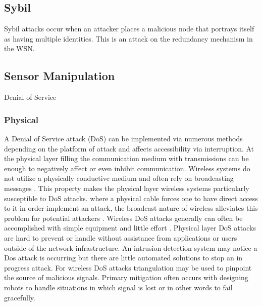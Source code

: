 \subsection{Sybil}
Sybil attacks occur when an attacker places a malicious node that portrays itself as having multiple identities. This is an attack on the redundancy mechanism in the WSN. 
\subsection{Sensor Manipulation}

Denial of Service 


\subsubsection{Physical}
A Denial of Service attack (DoS) can be implemented via numerous methods depending on the platform of attack and affects accessibility via interruption. At the physical layer filling the communication medium with transmissions can be enough to negatively affect or even inhibit communication.  Wireless systems do not utilize a physically conductive medium and often rely on broadcasting messages \cite{Cepheli-2013}.  This property makes the physical layer wireless systems particularly susceptible to DoS attacks. where a physical cable forces one to have direct access to it in order implement an attack, the broadcast nature of wireless alleviates this problem for potential attackers \cite{pelechrinis:denial}.  Wireless DoS attacks generally can often be accomplished with simple equipment and little effort \cite{pelechrinis:denial}.  Physical layer DoS attacks are hard to prevent or handle without assistance from applications or users outside of the network infrastructure.  An intrusion detection system may notice a Dos attack is occurring but there are little automated solutions to stop an in progress attack. For wireless DoS attacks triangulation may be used to pinpoint the source of malicious signals. Primary mitigation often occurs with designing robots to handle situations in which signal is lost or in other words to fail gracefully.

